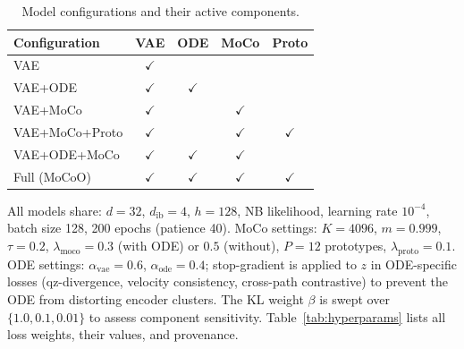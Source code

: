\documentclass[preprint,12pt,number]{elsarticle}
\begin{document}
\begin{table}[!t]
    \centering
    \caption{Model configurations and their active components.}
    \label{tab:configs}
    \begin{tabular}{lcccc}
        \toprule
        Configuration   & VAE          & ODE          & MoCo         & Proto \\
        \midrule
        VAE             & $\checkmark$ &              &              &              \\
        VAE+ODE         & $\checkmark$ & $\checkmark$ &              &              \\
        VAE+MoCo        & $\checkmark$ &              & $\checkmark$ &              \\
        VAE+MoCo+Proto  & $\checkmark$ &              & $\checkmark$ & $\checkmark$ \\
        VAE+ODE+MoCo    & $\checkmark$ & $\checkmark$ & $\checkmark$ &              \\
        Full (MoCoO)    & $\checkmark$ & $\checkmark$ & $\checkmark$ & $\checkmark$ \\
        \bottomrule
    \end{tabular}
\end{table}

All models share: $d = 32$, $d_{\mathrm{ib}} = 4$, $h = 128$, NB likelihood, learning rate $10^{-4}$, batch size 128, 200 epochs (patience 40). MoCo settings: $K = 4096$, $m = 0.999$, $\tau = 0.2$, $\lambda_{\mathrm{moco}} = 0.3$ (with ODE) or $0.5$ (without), $P = 12$ prototypes, $\lambda_{\mathrm{proto}} = 0.1$. ODE settings: $\alpha_{\mathrm{vae}} = 0.6$, $\alpha_{\mathrm{ode}} = 0.4$; stop-gradient is applied to $z$ in ODE-specific losses (qz-divergence, velocity consistency, cross-path contrastive) to prevent the ODE from distorting encoder clusters. The KL weight $\beta$ is swept over $\{1.0, 0.1, 0.01\}$ to assess component sensitivity. Table~\ref{tab:hyperparams} lists all loss weights, their values, and provenance.
\end{document}

